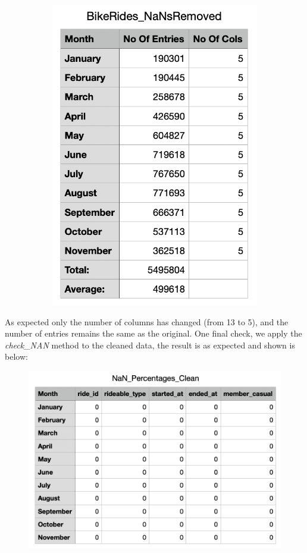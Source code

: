 \documentclass[12pt]{article}
\begin{document}
\begin{itemize}
\begin{figure}[h]
\begin{subfigure}{.4\textwidth}
		\includegraphics[scale=0.5]{img4.png}
	\end{subfigure}
	\end{figure}
	As expected only the number of columns has changed (from 13 to 5), and the number of entries remains the same as the original. One final check, we apply the \textit{check\_NAN} method to the cleaned data, the result is as expected and shown is below:
	
	\begin{figure}[h]
	\centering
	\includegraphics[scale=0.4]{imgNAN2.png}
	\end{figure}
		
\end{itemize} 
\end{document}
